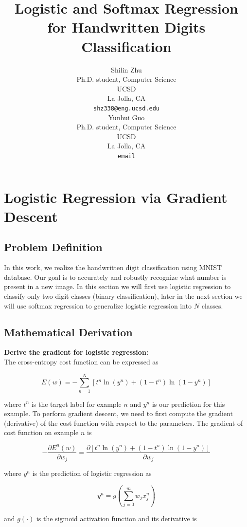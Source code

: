 \documentclass{article} %
\title{Logistic and Softmax Regression for Handwritten Digits Classification}
\author{
Shilin Zhu \\
Ph.D. student, Computer Science\\
UCSD\\
La Jolla, CA \\
\texttt{shz338@eng.ucsd.edu} \\
\And
Yunhui Guo\\
Ph.D. student, Computer Science\\
UCSD\\
La Jolla, CA \\
\texttt{email} \\
}
\begin{document}
\maketitle

\section{Logistic Regression via Gradient Descent}

\subsection{Problem Definition}
In this work, we realize the handwritten digit classification using MNIST database. Our goal is to accurately and robustly recognize what number is present in a new image. In this section we will first use logistic regression to classify only two digit classes (binary classification), later in the next section we will use softmax regression to generalize logistic regression into $N$ classes.

\subsection{Mathematical Derivation}
\textbf{Derive the gradient for logistic regression:} \\
The cross-entropy cost function can be expressed as

\begin{equation}
	E(w) = - \sum_{n=1}^{N}[t^{n}\ln(y^{n})+(1-t^{n})\ln(1-y^{n})]
\end{equation}

where $t^{n}$ is the target label for example $n$ and $y^{n}$ is our prediction for this example. To perform gradient descent, we need to first compute the gradient (derivative) of the cost function with respect to the parameters. The gradient of cost function on example $n$ is

\begin{equation}
	-\frac{\partial E^{n}(w)}{\partial w_{j}} = \frac{\partial [t^{n}\ln(y^{n})+(1-t^{n})\ln(1-y^{n})]}{\partial w_{j}} 
\end{equation}

where $y^{n}$ is the prediction of logistic regression as

\begin{equation}
	y^{n} = g(\sum_{j=0}^{m}w_{j}x_{j}^{n})
\end{equation}

and $g(\cdot)$ is the sigmoid activation function and its derivative is
\end{document}
